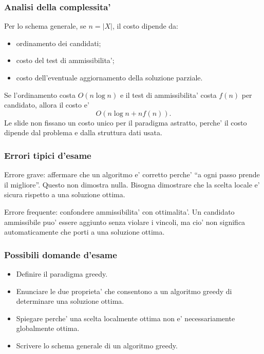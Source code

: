 \subsubsection{Analisi della complessita'}
Per lo schema generale, se $n=|X|$, il costo dipende da:
\begin{itemize}
	\item ordinamento dei candidati;
	\item costo del test di ammissibilita';
	\item costo dell'eventuale aggiornamento della soluzione parziale.
\end{itemize}
Se l'ordinamento costa $O(n\log n)$ e il test di ammissibilita' costa $f(n)$ per candidato, allora il costo e'
\[
O(n\log n+n f(n)).
\]
Le slide non fissano un costo unico per il paradigma astratto, perche' il costo dipende dal problema e dalla struttura dati usata.

\subsubsection{Errori tipici d'esame}
\begin{hardnote}
Errore grave: affermare che un algoritmo e' corretto perche' ``a ogni passo prende il migliore''. Questo non dimostra nulla. Bisogna dimostrare che la scelta locale e' sicura rispetto a una soluzione ottima.
\end{hardnote}

\begin{hardnote}
Errore frequente: confondere ammissibilita' con ottimalita'. Un candidato ammissibile puo' essere aggiunto senza violare i vincoli, ma cio' non significa automaticamente che porti a una soluzione ottima.
\end{hardnote}

\subsubsection{Possibili domande d'esame}
\begin{itemize}
	\item Definire il paradigma greedy.
	\item Enunciare le due proprieta' che consentono a un algoritmo greedy di determinare una soluzione ottima.
	\item Spiegare perche' una scelta localmente ottima non e' necessariamente globalmente ottima.
	\item Scrivere lo schema generale di un algoritmo greedy.
\end{itemize}

